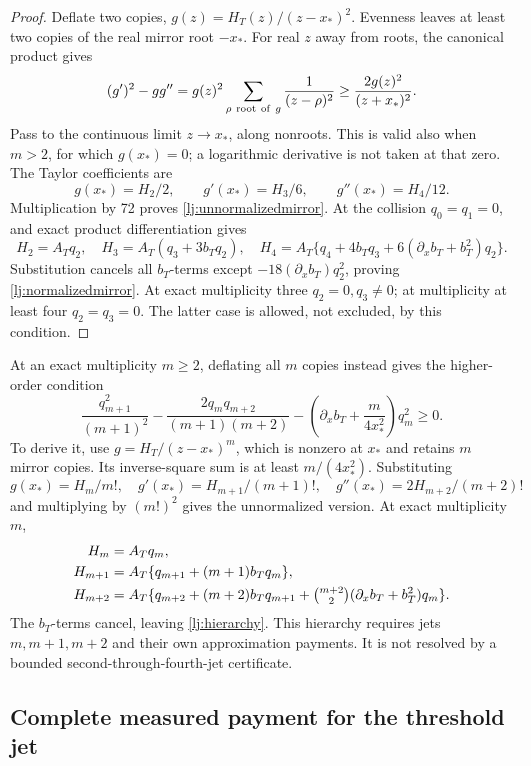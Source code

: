 \documentclass[11pt]{article}
\numberwithin{equation}{section}
\theoremstyle{definition}
\theoremstyle{remark}
\begin{document}
\begin{proof}
Deflate two copies, \(g(z)=H_T(z)/(z-x_*)^2\). Evenness leaves at
least two copies of the real mirror root \(-x_*\).
For real \(z\) away from roots, the canonical product gives
\[
 (g')^2-gg''
       =g(z)^2\sum_{\rho\ {\rm root\ of}\ g}\frac1{(z-\rho)^2}
       \ge\frac{2g(z)^2}{(z+x_*)^2}.
\]
Pass to the continuous limit \(z\to x_*\), along nonroots. This is
valid also when \(m>2\), for which \(g(x_*)=0\); a logarithmic
derivative is not taken at that zero. The Taylor coefficients are
\[
 g(x_*)=H_2/2,\qquad g'(x_*)=H_3/6,\qquad g''(x_*)=H_4/12.
\]
Multiplication by 72 proves \eqref{lj:unnormalizedmirror}.
At the collision \(q_0=q_1=0\), and exact product differentiation gives
\[
 H_2=A_Tq_2,\quad
 H_3=A_T(q_3+3b_Tq_2),\quad
 H_4=A_T\{q_4+4b_Tq_3+6(\partial_xb_T+b_T^2)q_2\}.
\]
Substitution cancels all \(b_T\)-terms except
\(-18(\partial_xb_T)q_2^2\), proving
\eqref{lj:normalizedmirror}.
At exact multiplicity three \(q_2=0,q_3\ne0\); at multiplicity
at least four \(q_2=q_3=0\). The latter case is allowed, not excluded,
by this condition.
\end{proof}

At an exact multiplicity \(m\ge2\), deflating all \(m\) copies instead
gives the higher-order condition
\begin{equation}\label{lj:hierarchy}
 \frac{q_{m+1}^2}{(m+1)^2}
 -\frac{2q_mq_{m+2}}{(m+1)(m+2)}
 -\left(\partial_xb_T+\frac{m}{4x_*^2}\right)q_m^2\ge0.
\end{equation}
To derive it, use \(g=H_T/(z-x_*)^m\), which is nonzero at \(x_*\)
and retains \(m\) mirror copies. Its inverse-square sum is at least
\(m/(4x_*^2)\). Substituting
\[
 g(x_*)=H_m/m!,\quad
 g'(x_*)=H_{m+1}/(m+1)!,\quad
 g''(x_*)=2H_{m+2}/(m+2)!
\]
and multiplying by \((m!)^2\) gives the unnormalized version.
At exact multiplicity \(m\),
\begin{align*}
 H_m&=A_Tq_m,\\
 H_{m+1}&=A_T\{q_{m+1}+(m+1)b_Tq_m\},\\
 H_{m+2}&=A_T\{q_{m+2}+(m+2)b_Tq_{m+1}
               +\tbinom{m+2}{2}(\partial_xb_T+b_T^2)q_m\}.
\end{align*}
The \(b_T\)-terms cancel, leaving \eqref{lj:hierarchy}.
This hierarchy requires jets \(m,m+1,m+2\) and their own approximation
payments. It is not resolved by a bounded second-through-fourth-jet
certificate.

\subsection{Complete measured payment for the threshold jet}
\end{document}
